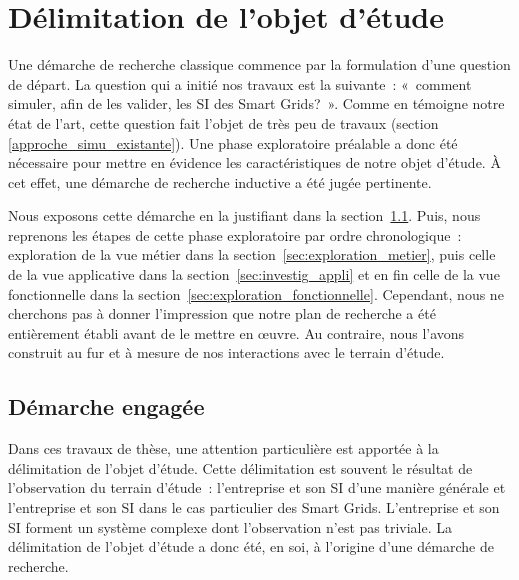 \chapter{Délimitation de l'objet d'étude}
\label{ch:methodo}

\PartialToc


Une démarche de recherche classique commence par la formulation d'une question 
de départ. La question qui a initié nos travaux est la suivante~: «~comment 
simuler, afin de les valider, les SI des Smart Grids?~».  Comme en témoigne notre 
état de l'art, cette question fait l'objet de très peu de travaux (section 
\ref{approche_simu_existante}). Une phase exploratoire préalable a donc été nécessaire 
pour mettre en évidence les caractéristiques de notre objet d'étude. À cet effet,
une démarche de recherche inductive a été jugée pertinente.

Nous exposons cette démarche en la justifiant dans la section~\ref{sec:demarche_objet_etude}.
Puis, nous reprenons les étapes de cette phase exploratoire 
par ordre chronologique~: exploration de la vue métier dans la section~\ref{sec:exploration_metier}, puis celle de la vue 
applicative dans la section~\ref{sec:investig_appli} et en fin celle de la vue fonctionnelle dans 
la section~\ref{sec:exploration_fonctionnelle}.
Cependant, nous ne cherchons pas à donner l'impression que notre plan de recherche a été 
entièrement établi avant de le mettre en œuvre. Au contraire, nous l'avons 
construit au fur et à mesure de nos interactions avec le terrain d'étude. 








\section{Démarche engagée}
\label{sec:demarche_objet_etude}
		
Dans ces travaux de thèse, une attention particulière est apportée à la délimitation de l'objet d'étude. 
Cette délimitation est souvent le résultat de l'observation du terrain d'étude~: 
l'entreprise et son SI d'une manière générale et l'entreprise et son SI dans le 
cas particulier des Smart Grids. L'entreprise et son SI forment un système 
complexe dont l'observation n'est pas triviale. La délimitation de l'objet 
d'étude a donc été, en soi, à l'origine d'une démarche de recherche.


